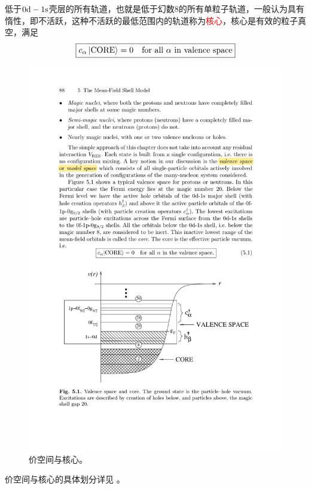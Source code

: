 低于$0\rm{d}-1\rm{s}$壳层的所有轨道，也就是低于幻数8的所有单粒子轨道，一般认为具有惰性，即不活跃，这种不活跃的最低范围内的轨道称为\textcolor{red}{核心}，核心是有效的粒子真空，满足
\begin{equation}
    \boxed{
    c_{\alpha} \ket{\rm{CORE}} = 0 \quad \text{for all $\alpha$ in valence space}
    }
\end{equation}
\begin{figure}[htbp]
    \centering
    \setlength{\abovecaptionskip}{0.2cm}
    \includegraphics[scale=1.2]{figure/nuclear/valence-space.pdf}
    \caption{价空间与核心\citet{suhonen-NtoN}。}
    \label{fig:valence-space}
\end{figure}
价空间与核心的具体划分详见 \citet[Sec. 5.1]{suhonen-NtoN}。

